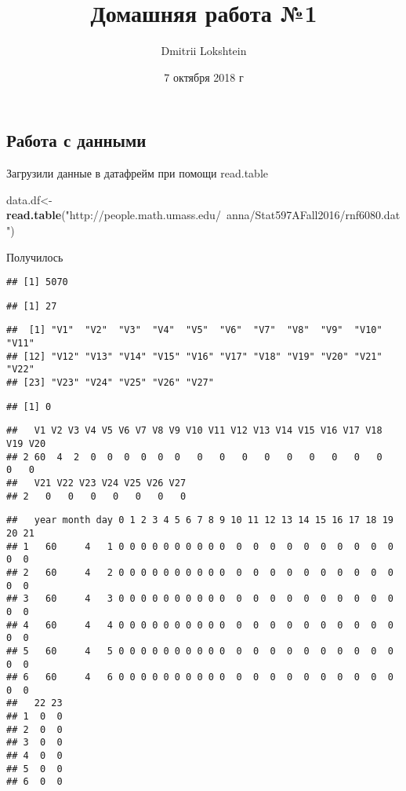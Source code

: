 \documentclass[]{article}
\title{Домашняя работа №1}
\author{Dmitrii Lokshtein}
\date{7 октября 2018 г}
\newenvironment{Shaded}{\begin{snugshade}}{\end{snugshade}}
\newcommand{\KeywordTok}[1]{\textcolor[rgb]{0.13,0.29,0.53}{\textbf{#1}}}
\newcommand{\StringTok}[1]{\textcolor[rgb]{0.31,0.60,0.02}{#1}}
\newcommand{\NormalTok}[1]{#1}
\begin{document}
\maketitle

\subsection{Работа с данными}\label{--}

Загрузили данные в датафрейм при помощи read.table

\begin{Shaded}
\begin{Highlighting}[]
\NormalTok{data.df<-}\KeywordTok{read.table}\NormalTok{(}\StringTok{"http://people.math.umass.edu/~anna/Stat597AFall2016/rnf6080.dat"}\NormalTok{)}
\end{Highlighting}
\end{Shaded}

Получилось

\begin{verbatim}
## [1] 5070
\end{verbatim}

\begin{verbatim}
## [1] 27
\end{verbatim}

\begin{verbatim}
##  [1] "V1"  "V2"  "V3"  "V4"  "V5"  "V6"  "V7"  "V8"  "V9"  "V10" "V11"
## [12] "V12" "V13" "V14" "V15" "V16" "V17" "V18" "V19" "V20" "V21" "V22"
## [23] "V23" "V24" "V25" "V26" "V27"
\end{verbatim}

\begin{verbatim}
## [1] 0
\end{verbatim}

\begin{verbatim}
##   V1 V2 V3 V4 V5 V6 V7 V8 V9 V10 V11 V12 V13 V14 V15 V16 V17 V18 V19 V20
## 2 60  4  2  0  0  0  0  0  0   0   0   0   0   0   0   0   0   0   0   0
##   V21 V22 V23 V24 V25 V26 V27
## 2   0   0   0   0   0   0   0
\end{verbatim}

\begin{verbatim}
##   year month day 0 1 2 3 4 5 6 7 8 9 10 11 12 13 14 15 16 17 18 19 20 21
## 1   60     4   1 0 0 0 0 0 0 0 0 0 0  0  0  0  0  0  0  0  0  0  0  0  0
## 2   60     4   2 0 0 0 0 0 0 0 0 0 0  0  0  0  0  0  0  0  0  0  0  0  0
## 3   60     4   3 0 0 0 0 0 0 0 0 0 0  0  0  0  0  0  0  0  0  0  0  0  0
## 4   60     4   4 0 0 0 0 0 0 0 0 0 0  0  0  0  0  0  0  0  0  0  0  0  0
## 5   60     4   5 0 0 0 0 0 0 0 0 0 0  0  0  0  0  0  0  0  0  0  0  0  0
## 6   60     4   6 0 0 0 0 0 0 0 0 0 0  0  0  0  0  0  0  0  0  0  0  0  0
##   22 23
## 1  0  0
## 2  0  0
## 3  0  0
## 4  0  0
## 5  0  0
## 6  0  0
\end{verbatim}
\end{document}
